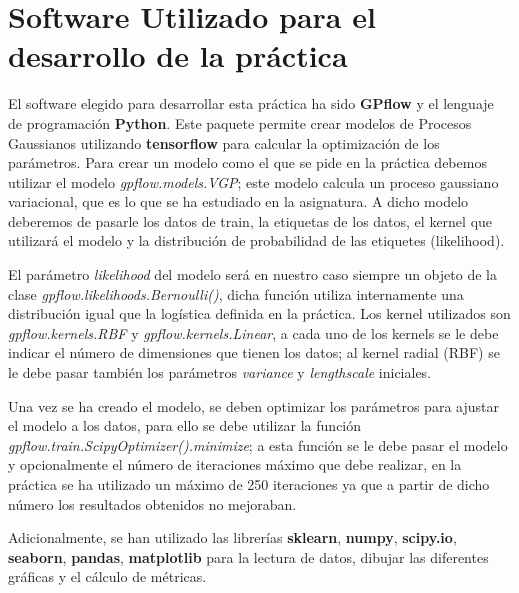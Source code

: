 \chapter{Software Utilizado para el desarrollo de la práctica}
El software elegido para desarrollar esta práctica ha sido \textbf{GPflow} y el lenguaje de programación \textbf{Python}. Este paquete permite crear modelos de Procesos Gaussianos utilizando \textbf{tensorflow} para calcular la optimización de los parámetros. Para crear un modelo como el que se pide en la práctica debemos utilizar el modelo \textit{gpflow.models.VGP}; este modelo calcula un proceso gaussiano variacional, que es lo que se ha estudiado en la asignatura. A dicho modelo deberemos de pasarle los datos de train, la etiquetas de los datos, el kernel que utilizará el modelo y la distribución de probabilidad de las etiquetes (likelihood). \newline

El parámetro \textit{likelihood} del modelo será en nuestro caso siempre un objeto de la clase \textit{gpflow.likelihoods.Bernoulli()}, dicha función utiliza internamente una distribución igual que la logística definida en la práctica. Los kernel utilizados son \textit{gpflow.kernels.RBF} y \textit{gpflow.kernels.Linear}, a cada uno de los kernels se le debe indicar el número de dimensiones que tienen los datos; al kernel radial (RBF) se le debe pasar también los parámetros \textit{variance} y \textit{lengthscale} iniciales.\newline

Una vez se ha creado el modelo, se deben optimizar los parámetros para ajustar el modelo a los datos, para ello se debe utilizar la función \textit{gpflow.train.ScipyOptimizer().minimize}; a esta función se le debe pasar el modelo y opcionalmente el número de iteraciones máximo que debe realizar, en la práctica se ha utilizado un máximo de 250 iteraciones ya que a partir de dicho número los resultados obtenidos no mejoraban.\newline

Adicionalmente, se han utilizado las librerías \textbf{sklearn}, \textbf{numpy}, \textbf{scipy.io}, \textbf{seaborn}, \textbf{pandas}, \textbf{matplotlib} para la lectura de datos, dibujar las diferentes gráficas y el cálculo de métricas.